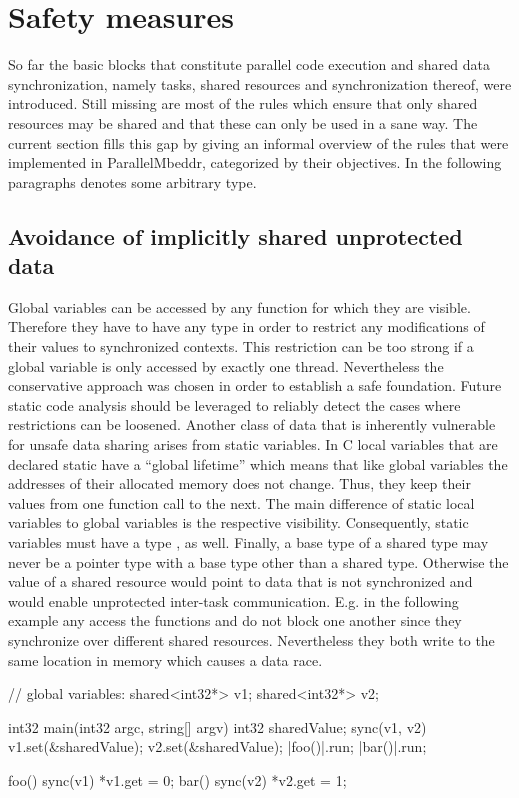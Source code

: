 \section{Safety measures}
\label{safetyMeasures}
So far the basic blocks that constitute parallel code execution and shared data synchronization, namely tasks, shared resources and synchronization thereof, were introduced. Still missing are most of the rules which ensure that only shared resources may be shared and that these can only be used in a sane way. The current section fills this gap by giving an informal overview of the rules that were implemented in ParallelMbeddr, categorized by their objectives. In the following paragraphs  denotes some arbitrary type.

\subsection{Avoidance of implicitly shared unprotected data}
Global variables can be accessed by any function for which they are visible. Therefore they have to have any type  in order to restrict any modifications of their values to synchronized contexts. This restriction can be too strong if a global variable is only accessed by exactly one thread. Nevertheless the conservative approach was chosen in order to establish a safe foundation. Future static code analysis should be leveraged to reliably detect the cases where restrictions can be loosened.
Another class of data that is inherently vulnerable for unsafe data sharing arises from static variables. In C local variables that are declared static have a ``global lifetime'' \cite[p.~439]{ProgrammingInC} which means that like global variables the addresses of their allocated memory does not change. Thus, they keep their values from one function call to the next. The main difference of static local variables to global variables is the respective visibility. Consequently, static variables must have a type , as well.
Finally, a base type  of a shared type may never be a pointer type with a base type other than a shared type. Otherwise the value of a shared resource would point to data that is not synchronized and would enable unprotected inter-task communication. E.g. in the following example any access the functions  and  do not block one another since they synchronize over different shared resources. Nevertheless they both write to the same location in memory which causes a data race.
\begin{ccode}
// global variables:
shared<int32*> v1;
shared<int32*> v2;

int32 main(int32 argc, string[] argv) {
  int32 sharedValue;
  sync(v1, v2) {
    v1.set(&sharedValue);
    v2.set(&sharedValue);
  }
  |foo()|.run;
  |bar()|.run;
}

foo() {
  sync(v1) { *v1.get = 0; }
}
bar() {
  sync(v2) { *v2.get = 1; }
}
\end{ccode}

